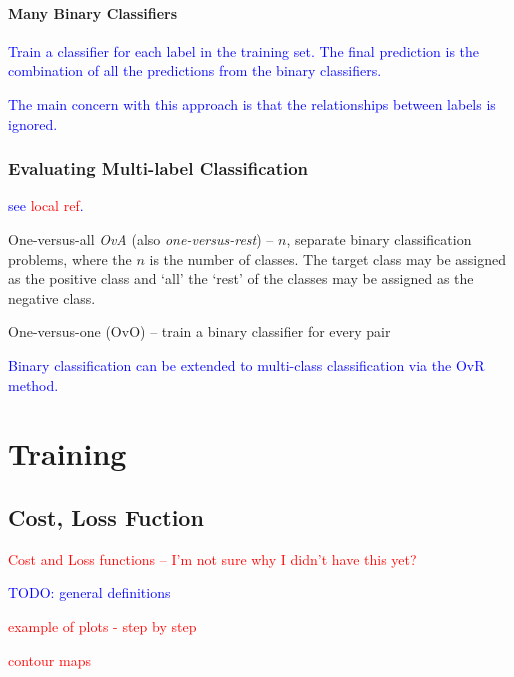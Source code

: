 \paragraph{Many Binary Classifiers}

\textcolor{blue}{Train a classifier for each label in the training set. The final prediction is the combination of all the predictions from the binary classifiers.}

\textcolor{blue}{The main concern with this approach is that the relationships between labels is ignored.}

\subsubsection{Evaluating Multi-label Classification}

\textcolor{blue}{see \textcolor{red}{local ref}.}

One-versus-all \emph{OvA} (also \emph{one-versus-rest}) -- $n$, separate binary classification problems, where the $n$ is the number of classes. The target class may be assigned as the positive class and `all' the `rest' of the classes may be assigned as the negative class.

One-versus-one (OvO) -- train a binary classifier for every pair


\textcolor{blue}{Binary classification can be extended to multi-class classification via the OvR method.}


\section{Training}

\subsection{Cost, Loss Fuction}

\textcolor{red}{Cost and Loss functions -- I'm not sure why I didn't have this yet?}

\textcolor{blue}{TODO: general definitions}

\textcolor{red}{example of plots - step by step}

\textcolor{red}{contour maps}


